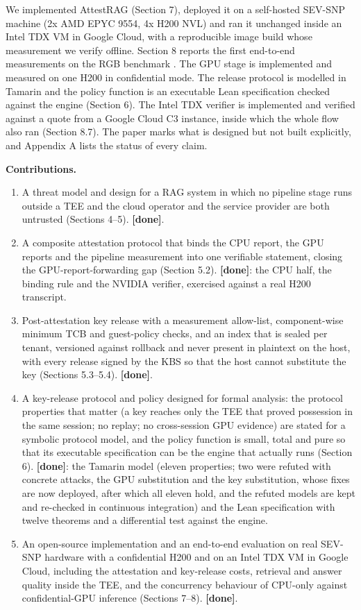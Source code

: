 \documentclass[letterpaper,twocolumn,10pt]{article}
\providecommand{\tightlist}{\setlength{\itemsep}{0pt}\setlength{\parskip}{0pt}}
\begin{document}
We implemented AttestRAG (Section 7), deployed it on a self-hosted SEV-SNP machine (2x AMD EPYC 9554, 4x H200 NVL) and ran it unchanged inside an Intel TDX VM in Google Cloud, with a reproducible image build whose measurement we verify offline. Section 8 reports the first end-to-end measurements on the RGB benchmark \cite{chen2024rgb}. The GPU stage is implemented and measured on one H200 in confidential mode. The release protocol is modelled in Tamarin and the policy function is an executable Lean specification checked against the engine (Section 6). The Intel TDX verifier is implemented and verified against a quote from a Google Cloud C3 instance, inside which the whole flow also ran (Section 8.7). The paper marks what is designed but not built explicitly, and Appendix A lists the status of every claim.

\textbf{Contributions.}

\begin{enumerate}
\def\labelenumi{\arabic{enumi}.}
\tightlist
\item
  A threat model and design for a RAG system in which no pipeline stage runs outside a TEE and the cloud operator and the service provider are both untrusted (Sections 4--5). \textbf{{[}done{]}}.
\item
  A composite attestation protocol that binds the CPU report, the GPU reports and the pipeline measurement into one verifiable statement, closing the GPU-report-forwarding gap (Section 5.2). \textbf{{[}done{]}}: the CPU half, the binding rule and the NVIDIA verifier, exercised against a real H200 transcript.
\item
  Post-attestation key release with a measurement allow-list, component-wise minimum TCB and guest-policy checks, and an index that is sealed per tenant, versioned against rollback and never present in plaintext on the host, with every release signed by the KBS so that the host cannot substitute the key (Sections 5.3--5.4). \textbf{{[}done{]}}.
\item
  A key-release protocol and policy designed for formal analysis: the protocol properties that matter (a key reaches only the TEE that proved possession in the same session; no replay; no cross-session GPU evidence) are stated for a symbolic protocol model, and the policy function is small, total and pure so that its executable specification can be the engine that actually runs (Section 6). \textbf{{[}done{]}}: the Tamarin model (eleven properties; two were refuted with concrete attacks, the GPU substitution and the key substitution, whose fixes are now deployed, after which all eleven hold, and the refuted models are kept and re-checked in continuous integration) and the Lean specification with twelve theorems and a differential test against the engine.
\item
  An open-source implementation and an end-to-end evaluation on real SEV-SNP hardware with a confidential H200 and on an Intel TDX VM in Google Cloud, including the attestation and key-release costs, retrieval and answer quality inside the TEE, and the concurrency behaviour of CPU-only against confidential-GPU inference (Sections 7--8). \textbf{{[}done{]}}.
\end{enumerate}
\end{document}
